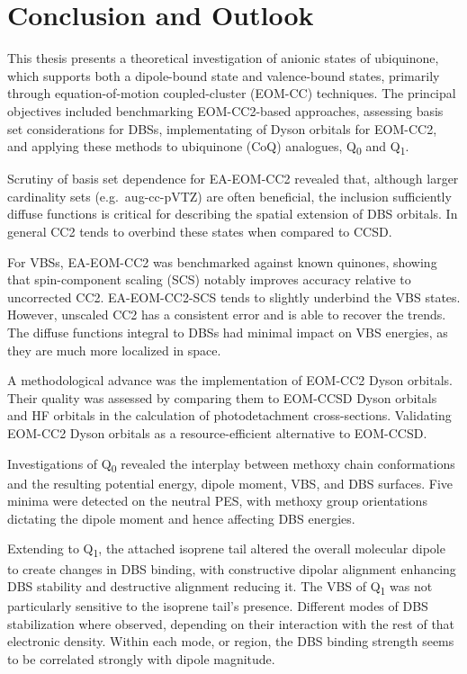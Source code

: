 \chapter{Conclusion and Outlook}\label{ch:conclusion}
This thesis presents a theoretical investigation of anionic states of ubiquinone, which supports both a dipole-bound state and valence-bound states, primarily through equation-of-motion coupled-cluster (EOM-CC) techniques. The principal objectives included benchmarking EOM-CC2-based approaches, assessing basis set considerations for DBSs, implementating of Dyson orbitals for EOM-CC2, and applying these methods to ubiquinone (CoQ) analogues, Q\textsubscript{0} and Q\textsubscript{1}.

Scrutiny of basis set dependence for EA-EOM-CC2 revealed that, although larger cardinality sets (e.g.\ aug-cc-pVTZ) are often beneficial, the inclusion sufficiently diffuse functions is critical for describing the spatial extension of DBS orbitals. In general CC2 tends to overbind these states when compared to CCSD.

For VBSs, EA-EOM-CC2 was benchmarked against known quinones, showing that spin-component scaling (SCS) notably improves accuracy relative to uncorrected CC2. EA-EOM-CC2-SCS tends to slightly underbind the VBS states. However, unscaled CC2 has a consistent error and is able to recover the trends. The diffuse functions integral to DBSs had minimal impact on VBS energies, as they are much more localized in space.

A methodological advance was the implementation of EOM-CC2 Dyson orbitals. Their quality was assessed by comparing them to EOM-CCSD Dyson orbitals and HF orbitals in the calculation of photodetachment cross-sections. Validating EOM-CC2 Dyson orbitals as a resource-efficient alternative to EOM-CCSD.

Investigations of Q\textsubscript{0} revealed the interplay between methoxy chain conformations and the resulting potential energy, dipole moment, VBS, and DBS surfaces. Five minima were detected on the neutral PES, with methoxy group orientations dictating the dipole moment and hence affecting DBS energies.

Extending to Q\textsubscript{1}, the attached isoprene tail altered the overall molecular dipole to create changes in DBS binding, with constructive dipolar alignment enhancing DBS stability and destructive alignment reducing it. The VBS of Q\textsubscript{1} was not particularly sensitive to the isoprene tail's presence.  Different modes of DBS stabilization where observed, depending on their interaction with the rest of that electronic density. Within each mode, or region, the DBS binding strength seems to be correlated strongly with dipole magnitude.

